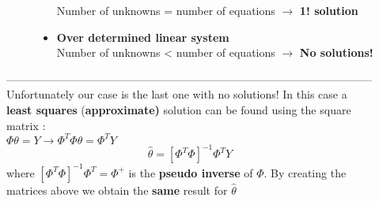 \begin{description}
\begin{description}
\begin{itemize}
Number of unknowns = number of equations $\to$ \textbf{1! solution}
\item \textbf{Over determined linear system}\\
Number of unknowns < number of equations $\to$ \textbf{No solutions!}
\end{itemize}
\end{description}
---------------------------------------------------------------------------------------------------
\\Unfortunately our case is the last one with no solutions! In this case a \textbf{least squares} (\textbf{approximate)} solution can be found using the square matrix  :\\ $ \Phi \theta = Y \to \Phi^T \Phi \theta = \Phi^T Y $
\[
\boxed{ \hat{\theta} = [\Phi^T \Phi]^{-1} \Phi^T Y} 
\]
where $ [\Phi^T \Phi]^{-1} \Phi^T = \Phi^{+} $ is the \textbf{pseudo inverse} of $\Phi$. By creating the matrices above we obtain the \textbf{same} result for 
$\hat{\theta}$
\end{description}

